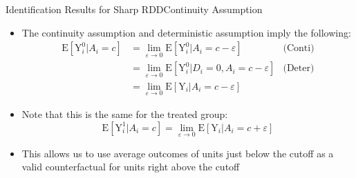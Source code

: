 \documentclass[dvipsnames,hyperref={pdfpagelabels=false}]{beamer}
\begin{document}
\begin{frame}{Identification Results for Sharp RDD}{Continuity Assumption}
	\begin{itemize}
		\item The continuity assumption and deterministic assumption imply the following:
		\begin{equation*}
		\begin{aligned}
		\mathrm{E}[\mathrm{Y}^{0}_{i}|A_i=c] &= \lim_{\varepsilon\rightarrow 0}\mathrm{E}[\mathrm{Y}^{0}_{i}|A_i=c-\varepsilon] &\text{(Conti})\\
		&= 	
		\lim_{\varepsilon\rightarrow 0}\mathrm{E}[\mathrm{Y}^{0}_{i}|D_i=0, A_i=c-\varepsilon] &\text{(Deter)} \\
		&= \lim_{\varepsilon\rightarrow 0}\mathrm{E}[\mathrm{Y}_{i}|A_i=c-\varepsilon] 
		\end{aligned}
		\end{equation*}
		\item Note that this is the same for the treated group:
		\begin{equation*}
		\mathrm{E}[\mathrm{Y}^{1}_{i}|A_i=c] = \lim_{\varepsilon\rightarrow 0}\mathrm{E}[\mathrm{Y}_{i}|A_i=c+\varepsilon]
		\end{equation*}
		\item This allows us to use average outcomes of units just below the cutoff as a valid counterfactual for units right above the cutoff 
		
	\end{itemize}
\end{frame}
\end{document}
